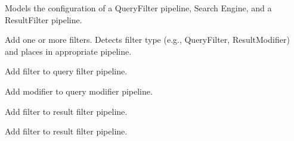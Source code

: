 \documentclass[letterpaper,10pt,english]{sphinxmanual}
\begin{document}
\begin{fulllineitems}
\label{api2.0:puppy.service.SearchService}
Models the configuration of a QueryFilter pipeline, Search Engine, and a ResultFilter pipeline.

\begin{fulllineitems}
\label{api2.0:puppy.service.SearchService.add_filters}
Add one or more filters. Detects filter type (e.g., QueryFilter,
ResultModifier) and places in appropriate pipeline.

\end{fulllineitems}


\begin{fulllineitems}
\label{api2.0:puppy.service.SearchService.add_query_filter}
Add filter to query filter pipeline.

\end{fulllineitems}


\begin{fulllineitems}
\label{api2.0:puppy.service.SearchService.add_query_modifier}
Add modifier to query modifier pipeline.

\end{fulllineitems}


\begin{fulllineitems}
\label{api2.0:puppy.service.SearchService.add_result_filter}
Add filter to result filter pipeline.

\end{fulllineitems}


\begin{fulllineitems}
\label{api2.0:puppy.service.SearchService.add_result_modifier}
Add filter to result filter pipeline.


\end{fulllineitems}
\end{fulllineitems}
\end{document}
